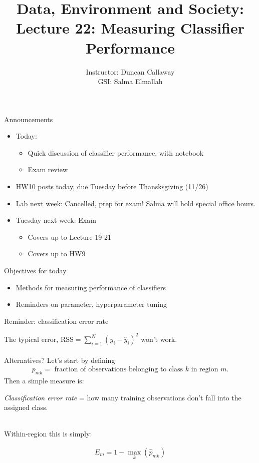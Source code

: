 \documentclass[mathserif, aspectratio=169, xcolor=table]{beamer}
\title[Lecture 22] %
{Data, Environment and Society: \\{Lecture 22: Measuring Classifier Performance}}
\author[ER131: Data, Environment and Society] 
{Instructor: Duncan Callaway\\
GSI: Salma Elmallah}
\institute[UC Berkeley] %
 {\small{ \bf November 14, 2019}}
\date[November 14, 2019]
\begin{document}
\frame{
	\titlepage
}

\begin{frame}{Announcements}
	\begin{itemize}
		\item Today: 
		\begin{itemize}
			\item Quick discussion of classifier performance, with notebook
			\item Exam review
		\end{itemize}
		\item HW10 posts today, due Tuesday before Thansksgiving (11/26)
		\item Lab next week: Cancelled, prep for exam!  Salma will hold special office hours.
		\item Tuesday next week: Exam
		\begin{itemize}
			\item Covers up to Lecture \sout{19} 21
			\item Covers up to HW9
		\end{itemize}
	\end{itemize}
\end{frame}


\begin{frame}{Objectives for today}
	\begin{itemize}
		\item Methods for measuring performance of classifiers
		\item Reminders on parameter, hyperparameter tuning
	\end{itemize}
	
\end{frame}

\begin{frame}{Reminder: classification error rate}

\pause
	The typical error, $\text{RSS} = \sum_{i=1}^N (y_i-\hat{y}_i)^2$ won't work.  \\~\\

	Alternatives?  Let's start by defining 
	\begin{align*}
	p_{mk} = \text{ fraction of observations belonging to class $k$ in region $m$.}
	\end{align*}
	Then a simple measure is:

	\begin{center}
	\textit{Classification error rate} = how many training observations don't fall into the assigned class.   \\~\\
	\end{center}

	 Within-region this is simply:

	\begin{align*}
	E_m = 1- \max_k (\hat{p}_{mk})
	\end{align*}
\end{frame}
\end{document}
